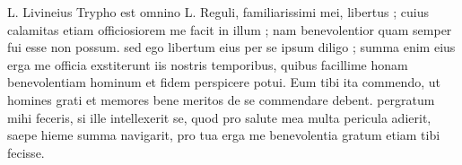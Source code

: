 


 L. Livineius Trypho est omnino L. Reguli, familiarissimi mei, libertus ; cuius calamitas etiam officiosiorem me facit in illum ; nam benevolentior quam semper fui esse non possum. sed ego libertum eius per se ipsum diligo ; summa enim eius erga me officia exstiterunt iis nostris temporibus, quibus facillime honam benevolentiam hominum et fidem perspicere potui. Eum tibi ita commendo, ut homines grati et memores bene meritos de se commendare debent. pergratum mihi feceris, si ille intellexerit se, quod pro salute mea multa pericula adierit, saepe hieme summa navigarit, pro tua erga me benevolentia gratum etiam tibi fecisse.
